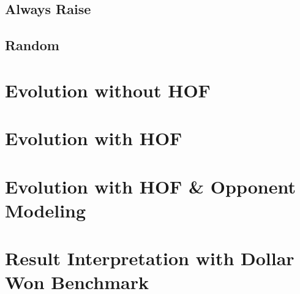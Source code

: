 \subsection{Always Raise}
\subsection{Random}

\section{Evolution without HOF}
\section{Evolution with HOF}
\section{Evolution with HOF \& Opponent Modeling}
\section{Result Interpretation with Dollar Won Benchmark}



